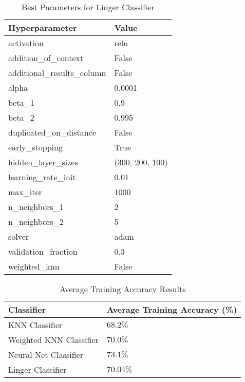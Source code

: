 \documentclass[a4paper, 12pt]{report}
\begin{document}
\begin{table}[H]
    \centering
    \caption{Best Parameters for Linger Classifier}
    \label{tab:best_parameters_linger_classifier_LC_Glass}
    \begin{tabular}{|l|l|}
    \hline
    \textbf{Hyperparameter} & \textbf{Value} \\ \hline
    activation & relu \\ \hline
    addition\_of\_context & False \\ \hline
    additional\_results\_column & False \\ \hline
    alpha & 0.0001 \\ \hline
    beta\_1 & 0.9 \\ \hline
    beta\_2 & 0.995 \\ \hline
    duplicated\_on\_distance & False \\ \hline
    early\_stopping & True \\ \hline
    hidden\_layer\_sizes & (300, 200, 100) \\ \hline
    learning\_rate\_init & 0.01 \\ \hline
    max\_iter & 1000 \\ \hline
    n\_neighbors\_1 & 2 \\ \hline
    n\_neighbors\_2 & 5 \\ \hline
    solver & adam \\ \hline
    validation\_fraction & 0.3 \\ \hline
    weighted\_knn & False \\ \hline
    \end{tabular}
\end{table}

\begin{table}[H]
    \centering
    \caption{Average Training Accuracy Results}
    \label{tab:average_results_train_Glass}
    \begin{tabular}{|l|l|}
    \hline
    \textbf{Classifier} & \textbf{Average Training Accuracy (\%)} \\ \hline
    KNN Classifier & $68.2\%$ \\ \hline
    Weighted KNN Classifier & $70.0\%$ \\ \hline
    Neural Net Classifier & $73.1\%$ \\ \hline
    Linger Classifier & $70.04\%$ \\ \hline
    \end{tabular}
\end{table}
\end{document}
